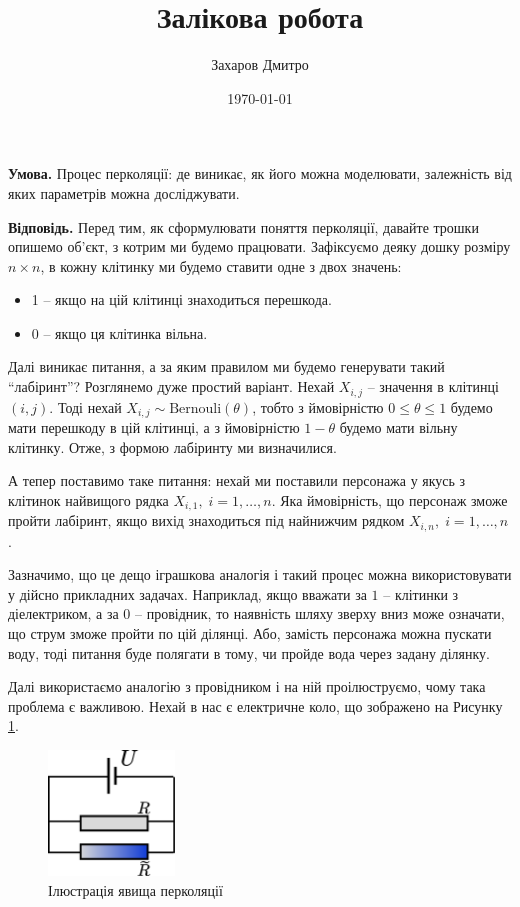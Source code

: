 \documentclass[oneside,solution]{tmpl}
\title{Залікова робота}
\author{Захаров Дмитро}
\date{\today}
\begin{document}
\maketitle



\hspace{20px}\textbf{Умова.} Процес перколяції: де виникає, як його можна моделювати, залежність від яких параметрів можна досліджувати.

\textbf{Відповідь.} Перед тим, як сформулювати поняття перколяції, давайте трошки опишемо об'єкт, з котрим ми будемо працювати. Зафіксуємо деяку дошку розміру $n \times n$, в кожну клітинку ми будемо ставити одне з двох значень:
\begin{itemize}
    \item 1 -- якщо на цій клітинці знаходиться перешкода.
    \item 0 -- якщо ця клітинка вільна.
\end{itemize}

Далі виникає питання, а за яким правилом ми будемо генерувати такий ``лабіринт''? Розглянемо дуже простий варіант. Нехай $X_{i,j}$ -- значення в клітинці $(i,j)$. Тоді нехай $X_{i,j} \sim \text{Bernouli}(\theta)$, тобто з ймовірністю $0 \leq \theta \leq 1$ будемо мати перешкоду в цій клітинці, а з ймовірністю $1-\theta$ будемо мати вільну клітинку. Отже, з формою лабіринту ми визначилися.

А тепер поставимо таке питання: нехай ми поставили персонажа у якусь з клітинок найвищого рядка $X_{i,1},\; i = 1,\dots,n$. Яка ймовірність, що персонаж зможе пройти лабіринт, якщо вихід знаходиться під найнижчим рядком $X_{i,n}, \;i = 1,\dots,n$.

Зазначимо, що це дещо іграшкова аналогія і такий процес можна використовувати у дійсно прикладних задачах. Наприклад, якщо вважати за $1$ -- клітинки з діелектриком, а за $0$ -- провідник, то наявність шляху зверху вниз може означати, що струм зможе пройти по цій ділянці. Або, замість персонажа можна пускати воду, тоді питання буде полягати в тому, чи пройде вода через задану ділянку. 

Далі використаємо аналогію з провідником і на ній проілюструємо, чому така проблема є важливою. Нехай в нас є електричне коло, що зображено на Рисунку \ref{fig:problem_1_illustration}.

\begin{figure}[H]
    \centering
    \includegraphics[width=0.3\textwidth]{images/exam/circuit.pdf}
    \caption{Ілюстрація явища перколяції}
    \label{fig:problem_1_illustration}
\end{figure}
\end{document}
